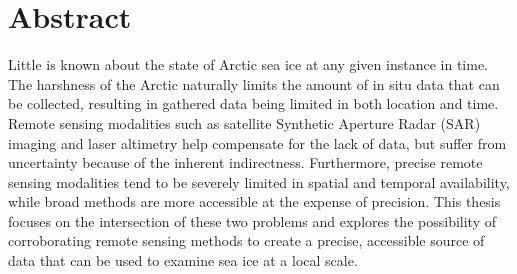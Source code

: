 
\chapter*{Abstract}

\indent Little is known about the state of Arctic sea ice at any given instance in time. The harshness of the Arctic naturally limits the amount of in situ data that can be collected, resulting in gathered data being limited in both location and time. Remote sensing modalities such as satellite Synthetic Aperture Radar (SAR) imaging and laser altimetry help compensate for the lack of data, but suffer from uncertainty because of the inherent indirectness. Furthermore, precise remote sensing modalities tend to be severely limited in spatial and temporal availability, while broad methods are more accessible at the expense of precision. This thesis focuses on the intersection of these two problems and explores the possibility of corroborating remote sensing methods to create a precise, accessible source of data that can be used to examine sea ice at a local scale.
\par

